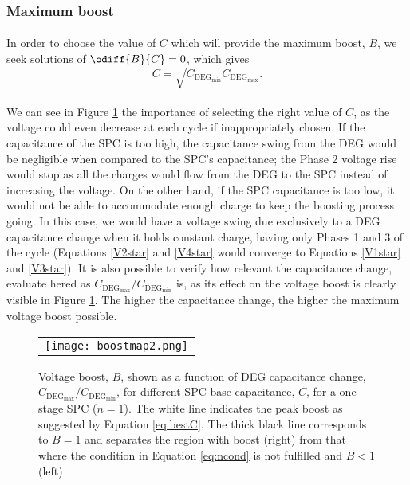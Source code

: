 \subsubsection{Maximum boost}

\paragraph{} In order to choose the value of $C$ which will provide the maximum boost, $B$, we seek solutions of $\odiff{B}{C}=0$, which gives
\begin{equation}\label{eq:bestC}
C= \sqrt{C_{\text{DEG}_{\text{min}}}C_{\text{DEG}_{\text{max}}}}.
\end{equation}

\paragraph{} We can see in Figure \ref{fig:boost} the importance of selecting the right value of $C$, as the voltage could even decrease at each cycle if inappropriately chosen. If the capacitance of the SPC is too high, the capacitance swing from the DEG would be negligible when compared to the SPC's  capacitance; the Phase 2 voltage rise would stop as all the charges would flow from the DEG to the SPC instead of increasing the voltage. On the other hand, if the SPC capacitance is too low, it would not be able to accommodate enough charge to keep the boosting process going. In this case, we would have a voltage swing due exclusively to a DEG capacitance change when it holds constant charge, having only Phases 1 and 3 of the cycle (Equations \ref{V2star} and \ref{V4star} would converge to Equations \ref{V1star} and \ref{V3star}). It is also possible to verify how relevant the capacitance change, evaluate hered as $C_{\text{DEG}_\text{max}}/C_{\text{DEG}_\text{min}}$ is, as its effect on the voltage boost is clearly visible in Figure \ref{fig:boost}. The higher the capacitance change, the higher the maximum voltage boost possible.

\begin{figure}[ht]
\begin{center}
\begin{tabular}{c}
\texttt{[image: boostmap2.png]}\\
\end{tabular}
\end{center}
\caption 
{ \label{fig:boost}
Voltage boost, $B$, shown as a function of DEG capacitance change, $C_{\text{DEG}_{\max}}/C_{\text{DEG}_{\min}}$, for different SPC base capacitance, $C$, for a one stage SPC ($n=1$). The white line indicates the peak boost as suggested by Equation \ref{eq:bestC}. The thick black line corresponds to $B=1$ and separates the region with boost (right) from that where the condition in Equation \ref{eq:ncond} is not fulfilled  and $B<1$ (left)}
\end{figure}



